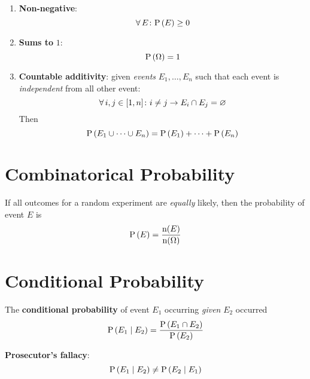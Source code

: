 \begin{enumerate}
    \item \textbf{Non-negative}:
    \begin{equation*}
        \operatorname{\forall} E \colon \mathrm{P} \left( E \right) \ge 0
    \end{equation*}
    \item \textbf{Sums to} $1$:
    \begin{equation*}
        \mathrm{P} \left( \Omega \right) = 1
    \end{equation*}
    \item \textbf{Countable additivity}: given \textit{events} $E_1, \dots, E_n$ such that each event is \textit{independent} from all other event:
    \begin{equation*}
        \operatorname{\forall} i, j \in [1, n] \colon i \ne j \to E_i \cap E_j = \varnothing
    \end{equation*}
    Then
    \begin{equation*}
        \mathrm{P} \left( E_1 \cup \cdots \cup E_n \right) = \mathrm{P} \left( E_1 \right) + \cdots + \mathrm{P} \left( E_n \right)
    \end{equation*}
\end{enumerate}

\section*{Combinatorical Probability}

If all outcomes for a random experiment are \textit{equally} likely, then the probability of event $E$ is
\begin{equation*}
    \mathrm{P} \left( E \right) = \frac{ \mathrm{n}(E) }{ \mathrm{n}(\Omega) }
\end{equation*}

\section*{Conditional Probability}

The \textbf{conditional probability} of event $E_1$ occurring \textit{given} $E_2$ occurred
\begin{equation*}
    \mathrm{P} \left( E_1 \mid E_2 \right) = \frac{ \mathrm{P} \left( E_1 \cap E_2 \right) }{ \mathrm{P} \left( E_2 \right) }
\end{equation*}

\begin{remark}
    \textbf{Prosecutor's fallacy}:
    \begin{equation*}
        \mathrm{P} \left( E_1 \mid E_2 \right) \ne \mathrm{P} \left( E_2 \mid E_1 \right)
    \end{equation*}
\end{remark}

